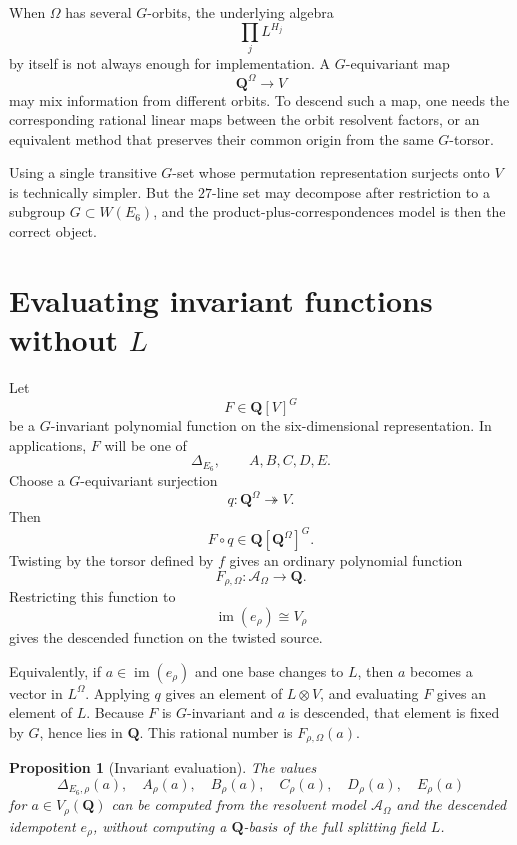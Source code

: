 \documentclass[11pt]{article}
\newcommand{\QQ}{\mathbf{Q}}
\newcommand{\im}{\operatorname{im}}
\newcommand{\cA}{\mathcal{A}}
\newcommand{\DeltaE}{\Delta_{E_6}}
\newtheorem{proposition}[definition]{Proposition}
\begin{document}
When $\Omega$ has several $G$-orbits, the underlying algebra
\[
  \prod_j L^{H_j}
\]
by itself is not always enough for implementation.  A $G$-equivariant map
\[
  \QQ^\Omega\to V
\]
may mix information from different orbits.  To descend such a map, one needs the
corresponding rational linear maps between the orbit resolvent factors, or an
equivalent method that preserves their common origin from the same $G$-torsor.

Using a single transitive $G$-set whose permutation representation surjects onto
$V$ is technically simpler.  But the $27$-line set may decompose after restriction
to a subgroup $G\subset W(E_6)$, and the product-plus-correspondences model is then
the correct object.

\section{Evaluating invariant functions without $L$}

Let
\[
  F\in \QQ[V]^G
\]
be a $G$-invariant polynomial function on the six-dimensional representation.  In
applications, $F$ will be one of
\[
  \DeltaE,
  \qquad
  A,
  B,
  C,
  D,
  E.
\]
Choose a $G$-equivariant surjection
\[
  q:\QQ^\Omega\twoheadrightarrow V.
\]
Then
\[
  F\circ q\in\QQ[\QQ^\Omega]^G.
\]
Twisting by the torsor defined by $f$ gives an ordinary polynomial function
\begin{equation}
  F_{\rho,\Omega}:\cA_\Omega\longrightarrow\QQ.
  \label{eq:descended-invariant}
\end{equation}
Restricting this function to
\[
  \im(e_\rho)\cong V_\rho
\]
gives the descended function on the twisted source.

Equivalently, if $a\in\im(e_\rho)$ and one base changes to $L$, then $a$ becomes a
vector in $L^\Omega$.  Applying $q$ gives an element of $L\otimes V$, and evaluating
$F$ gives an element of $L$.  Because $F$ is $G$-invariant and $a$ is descended,
that element is fixed by $G$, hence lies in $\QQ$.  This rational number is
$F_{\rho,\Omega}(a)$.

\begin{proposition}[Invariant evaluation]
The values
\[
  \Delta_{E_6,\rho}(a),\quad A_\rho(a),\quad B_\rho(a),\quad C_\rho(a),\quad
  D_\rho(a),\quad E_\rho(a)
\]
for $a\in V_\rho(\QQ)$ can be computed from the resolvent model
$\cA_\Omega$ and the descended idempotent $e_\rho$, without computing a
$\QQ$-basis of the full splitting field $L$.
\end{proposition}
\end{document}
